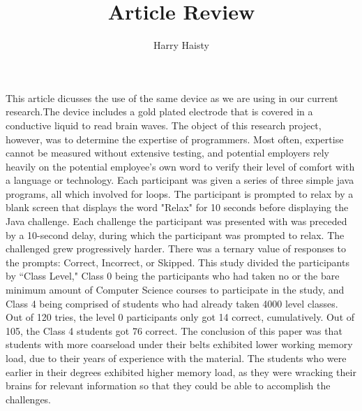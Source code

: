 \documentclass[11pt]{article}
\title{Article Review}
\author{Harry Haisty}
\begin{document}
\maketitle

This article dicusses the use of the same device as we are using in our current research.The device includes a gold plated electrode that is covered in a conductive liquid to read brain waves. The object of this research project, however, was to determine the expertise of programmers. Most often, expertise cannot be measured without extensive testing, and potential employers rely heavily on the potential employee's own word to verify their level of comfort with a language or technology. Each participant was given a series of three simple java programs, all which involved for loops. The participant is prompted to relax by a blank screen that displays the word "Relax" for 10 seconds before displaying the Java challenge.
\newline \newline
Each challenge the participant was presented with was preceded by a 10-second delay, during which the participant was prompted to relax. The challenged grew progressively harder. There was a ternary value of responses to the prompts: Correct, Incorrect, or Skipped. This study divided the participants by ``Class Level," Class 0 being the participants who had taken no or the bare minimum amount of Computer Science courses to participate in the study, and Class 4 being comprised of students who had already taken 4000 level classes. Out of  120 tries, the level 0 participants only got 14 correct, cumulatively. Out of 105, the Class 4 students got 76 correct. 
\newline\newline
The conclusion of this paper was that students with more coarseload under their belts exhibited lower working memory load, due to their years of experience with the material. The students who were earlier in their degrees exhibited higher memory load, as they were wracking their brains for relevant information so that they could be able to accomplish the challenges. 
\end{document}
